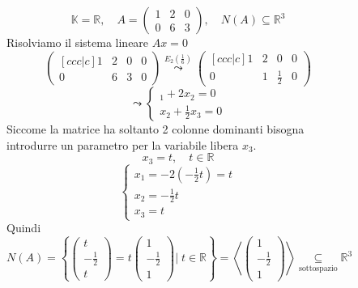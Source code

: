 \documentclass[a4paper]{article}
\theoremstyle{break}
\theoremstyle{break}
\theoremstyle{break}
\theoremstyle{break}
\begin{document}
\begin{figure}[H]
  \begin{example}
    \[
    \mathbb{K} = \mathbb{R}, \quad A = \begin{pmatrix} 
      1 & 2 & 0 \\
      0 & 6 & 3
    \end{pmatrix} 
    , \quad
    N(A) \subseteq \mathbb{R}^3
    \] 
    Risolviamo il sistema lineare \( Ax = 0 \) 
    \[
      \begin{pmatrix}[ccc|c]
        1 & 2 & 0 & 0\\
        0 & 6 & 3 & 0
    \end{pmatrix} 
    \stackrel{E_2(\frac{1}{6})}{\leadsto}
    \begin{pmatrix}[ccc|c]
      1 & 2 & 0 & 0\\
      0 & 1 & \frac{1}{2} & 0
    \end{pmatrix} 
    \] 
    \[
    \leadsto \begin{cases}
      _1 + 2x_2 = 0 \\
      x_2 + \frac{1}{2}x_3 = 0
    \end{cases}
    \] 
    Siccome la matrice ha soltanto 2 colonne dominanti bisogna introdurre un parametro
    per la variabile libera \( x_3 \).
    \[
    x_3 = t, \quad t \in \mathbb{R}
    \] 
    \[
    \begin{cases}
      x_1 = -2 \left( -\frac{1}{2}t \right) = t \\
      x_2 = -\frac{1}{2}t \\
      x_3 = t
    \end{cases}
    \] 
    Quindi \( N(A) = \left\{ \begin{pmatrix} t\\ -\frac{1}{2} \\ t \end{pmatrix} =
    t \begin{pmatrix} 1\\-\frac{1}{2}\\1 \end{pmatrix} \Big |\; t \in \mathbb{R} \right\}
    = \left< \begin{pmatrix} 1 \\ -\frac{1}{2} \\ 1 \end{pmatrix}  \right> 
    \underset{\text{sottospazio}}{\subseteq} \mathbb{R}^3 \) 
  \end{example}
\end{figure}
\end{document}
